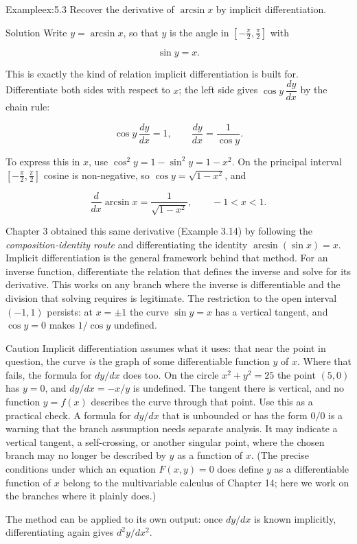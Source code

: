 \documentclass[a4paper,12pt,oneside]{memoir}
\begin{document}
\begin{workedexample}
\begin{envexample}{Example}{ex:5.3}{}
Recover the derivative of \(\arcsin x\) by implicit differentiation.
\end{envexample}
\begin{envsolution}{Solution}{}{}
Write \(y = \arcsin x\), so that \(y\) is the angle in \([-\tfrac{\pi}{2}, \tfrac{\pi}{2}]\) with

\[ \sin y = x. \]

This is exactly the kind of relation implicit differentiation is built for. Differentiate both sides with respect to \(x\); the left side gives \(\cos y\,\dfrac{dy}{dx}\) by the chain rule:

\[ \cos y\,\frac{dy}{dx} = 1, \qquad \frac{dy}{dx} = \frac{1}{\cos y}. \]

To express this in \(x\), use \(\cos^{2} y = 1 - \sin^{2} y = 1 - x^{2}\). On the principal interval \([-\tfrac{\pi}{2}, \tfrac{\pi}{2}]\) cosine is non-negative, so \(\cos y = \sqrt{1 - x^{2}}\), and

\[ \frac{d}{dx}\arcsin x = \frac{1}{\sqrt{1 - x^{2}}}, \qquad -1 < x < 1. \]

Chapter 3 obtained this same derivative (Example 3.14) by following the \emph{composition-identity route} and differentiating the identity \(\arcsin(\sin x) = x\). Implicit differentiation is the general framework behind that method. For an inverse function, differentiate the relation that defines the inverse and solve for its derivative. This works on any branch where the inverse is differentiable and the division that solving requires is legitimate. The restriction to the open interval \((-1, 1)\) persists: at \(x = \pm 1\) the curve \(\sin y = x\) has a vertical tangent, and \(\cos y = 0\) makes \(1/\cos y\) undefined. \qedmark
\end{envsolution}
\end{workedexample}
\begin{envcaution}{Caution}{}{}
Implicit differentiation assumes what it uses: that near the point in question, the curve \emph{is} the graph of some differentiable function \(y\) of \(x\). Where that fails, the formula for \(dy/dx\) does too. On the circle \(x^{2} + y^{2} = 25\) the point \((5, 0)\) has \(y = 0\), and \(dy/dx = -x/y\) is undefined. The tangent there is vertical, and no function \(y = f(x)\) describes the curve through that point. Use this as a practical check. A formula for \(dy/dx\) that is unbounded or has the form \(0/0\) is a warning that the branch assumption needs separate analysis. It may indicate a vertical tangent, a self-crossing, or another singular point, where the chosen branch may no longer be described by \(y\) as a function of \(x\). (The precise conditions under which an equation \(F(x, y) = 0\) does define \(y\) as a differentiable function of \(x\) belong to the multivariable calculus of Chapter 14; here we work on the branches where it plainly does.)
\end{envcaution}
The method can be applied to its own output: once \(dy/dx\) is known implicitly, differentiating again gives \(d^{2}y/dx^{2}\).
\end{document}
